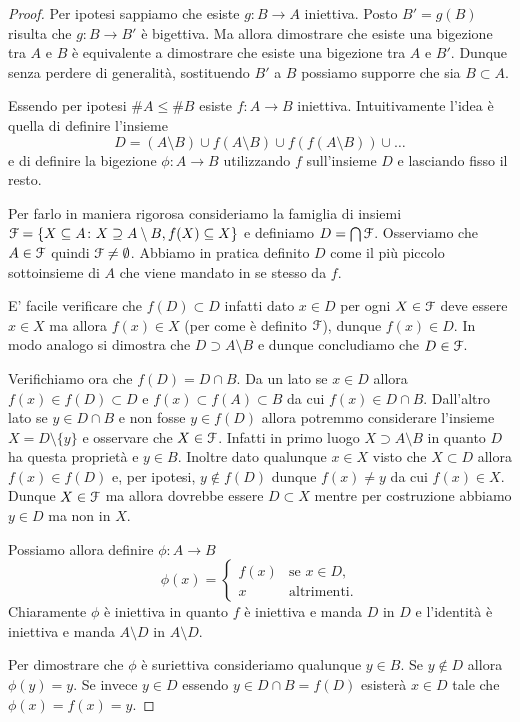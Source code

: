 \begin{proof}
Per ipotesi sappiamo che esiste
$g\colon B\to A$ iniettiva. 
Posto $B'=g(B)$ risulta che $g\colon B\to B'$ è bigettiva.
Ma allora dimostrare che esiste una bigezione tra $A$ e $B$ 
è equivalente a dimostrare che esiste una bigezione tra 
$A$ e $B'$. 
Dunque senza perdere di generalità, sostituendo $B'$ a $B$ 
possiamo supporre che sia $B\subset A$.

Essendo per ipotesi $\#A \le \#B$ esiste $f\colon A \to B$ iniettiva.
Intuitivamente l'idea è quella di definire l'insieme
\[
 D = (A\setminus B)  
 \cup f(A\setminus B) 
 \cup f(f(A\setminus B)) 
 \cup \dots
\]
e di definire la bigezione $\phi \colon A \to B$ 
utilizzando $f$ sull'insieme $D$ e lasciando fisso
il resto.

Per farlo in maniera rigorosa
consideriamo la famiglia di insiemi 
$\mathcal F = \{X \subseteq A \colon X \supseteq A \setminus B, f(X) \subseteq X\}$ 
e definiamo $D = \bigcap \mathcal F$.
Osserviamo che $A \in \mathcal F$ quindi $\mathcal F\neq \emptyset$.
Abbiamo in pratica definito $D$ come il più piccolo 
sottoinsieme di $A$ che viene mandato in se stesso da $f$.

E' facile verificare che $f(D) \subset D$ infatti dato $x\in D$ per ogni $X\in \mathcal F$ deve essere $x\in X$ ma allora $f(x) \in X$ (per come è definito $\mathcal F$), dunque $f(x) \in D$. 
In modo analogo si dimostra che $D\supset A\setminus B$ e dunque concludiamo che $D\in \mathcal F$.

Verifichiamo ora che $f(D)=D\cap B$. Da un lato se $x\in D$ allora
$f(x) \in f(D)\subset D$ e $f(x)\subset f(A)\subset B$ da cui $f(x) \in D\cap B$.
Dall'altro lato se $y\in D \cap B$ e non fosse $y \in f(D)$
allora potremmo considerare l'insieme $X=D\setminus\{y\}$
e osservare che $X\in \mathcal F$.
Infatti in primo luogo $X \supset A \setminus B$ in quanto $D$ ha questa proprietà e $y \in B$.
Inoltre dato qualunque $x \in X$ visto che $X\subset D$ allora
$f(x) \in f(D)$ e, per ipotesi,
$y\not \in f(D)$ dunque $f(x)\neq y$ da cui $f(x) \in X$.
Dunque $X\in \mathcal F$ ma allora dovrebbe essere $D\subset X$ mentre
per costruzione abbiamo $y\in D$ ma non in $X$.


Possiamo allora definire $\phi \colon A \to B$
\[
\phi(x) =
\begin{cases}
   f(x) & \text{se $x\in D$}, \\
   x & \text{altrimenti.}
\end{cases}
\]
Chiaramente $\phi$ è iniettiva in quanto $f$ è iniettiva e manda $D$ in $D$
e l'identità è iniettiva e manda $A\setminus D$ in $A\setminus D$.

Per dimostrare che $\phi$ è suriettiva consideriamo qualunque $y \in B$.
Se $y\not \in D$ allora $\phi(y)=y$.
Se invece $y\in D$ essendo $y\in D\cap B = f(D)$ esisterà $x\in D$ tale
che $\phi(x) = f(x) = y$.
\end{proof}

